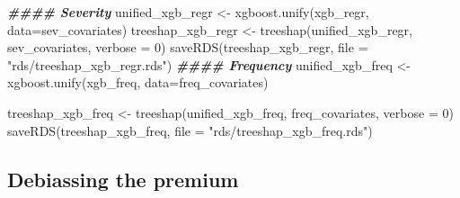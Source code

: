 \documentclass[
]{article}
\newenvironment{Shaded}{\begin{snugshade}}{\end{snugshade}}
\newcommand{\AttributeTok}[1]{\textcolor[rgb]{0.77,0.63,0.00}{#1}}
\newcommand{\DecValTok}[1]{\textcolor[rgb]{0.00,0.00,0.81}{#1}}
\newcommand{\DocumentationTok}[1]{\textcolor[rgb]{0.56,0.35,0.01}{\textbf{\textit{#1}}}}
\newcommand{\FunctionTok}[1]{\textcolor[rgb]{0.00,0.00,0.00}{#1}}
\newcommand{\NormalTok}[1]{#1}
\newcommand{\OtherTok}[1]{\textcolor[rgb]{0.56,0.35,0.01}{#1}}
\newcommand{\StringTok}[1]{\textcolor[rgb]{0.31,0.60,0.02}{#1}}
\begin{document}
\begin{Shaded}
\begin{Highlighting}[]
\DocumentationTok{\#\#\#\# Severity}
\NormalTok{unified\_xgb\_regr }\OtherTok{\textless{}{-}} \FunctionTok{xgboost.unify}\NormalTok{(xgb\_regr,}
                                  \AttributeTok{data=}\NormalTok{sev\_covariates)}
\NormalTok{treeshap\_xgb\_regr }\OtherTok{\textless{}{-}} \FunctionTok{treeshap}\NormalTok{(unified\_xgb\_regr,}
\NormalTok{                              sev\_covariates,}
                              \AttributeTok{verbose =} \DecValTok{0}\NormalTok{)}
\FunctionTok{saveRDS}\NormalTok{(treeshap\_xgb\_regr, }\AttributeTok{file =} \StringTok{"rds/treeshap\_xgb\_regr.rds"}\NormalTok{)}
\DocumentationTok{\#\#\#\# Frequency}
\NormalTok{unified\_xgb\_freq }\OtherTok{\textless{}{-}} \FunctionTok{xgboost.unify}\NormalTok{(xgb\_freq,}
                                  \AttributeTok{data=}\NormalTok{freq\_covariates)}

\NormalTok{treeshap\_xgb\_freq }\OtherTok{\textless{}{-}} \FunctionTok{treeshap}\NormalTok{(unified\_xgb\_freq,}
\NormalTok{                              freq\_covariates,}
                              \AttributeTok{verbose =} \DecValTok{0}\NormalTok{)}
\FunctionTok{saveRDS}\NormalTok{(treeshap\_xgb\_freq, }\AttributeTok{file =} \StringTok{"rds/treeshap\_xgb\_freq.rds"}\NormalTok{)}
\end{Highlighting}
\end{Shaded}

\hypertarget{debiassing-the-premium}{%
\subsection{Debiassing the premium}\label{debiassing-the-premium}}
\end{document}
